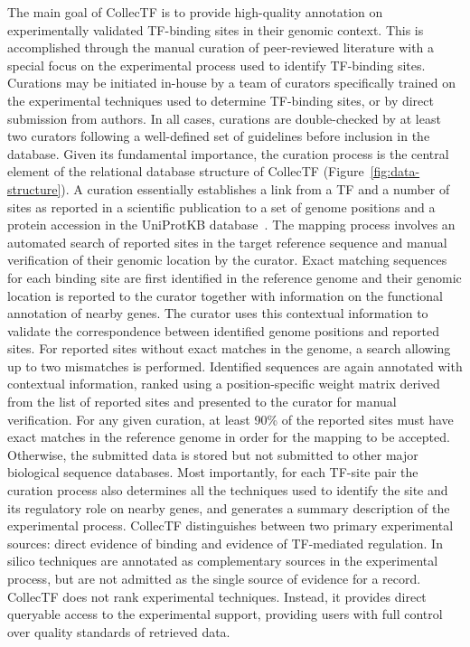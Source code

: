 
The main goal of CollecTF is to provide high-quality annotation on
experimentally validated TF-binding sites in their genomic context. This is
accomplished through the manual curation of peer-reviewed literature with a
special focus on the experimental process used to identify TF-binding
sites. Curations may be initiated in-house by a team of curators specifically
trained on the experimental techniques used to determine TF-binding sites, or
by direct submission from authors. In all cases, curations are double-checked
by at least two curators following a well-defined set of guidelines before
inclusion in the database. Given its fundamental importance, the curation
process is the central element of the relational database structure of CollecTF
(Figure~\ref{fig:data-structure}). A curation essentially establishes a link
from a TF and a number of sites as reported in a scientific publication to a
set of genome positions and a protein accession in the UniProtKB
database~\cite{uniprot2014uniprot}. The mapping process involves an automated
search of reported sites in the target reference sequence and manual
verification of their genomic location by the curator. Exact matching sequences
for each binding site are first identified in the reference genome and their
genomic location is reported to the curator together with information on the
functional annotation of nearby genes. The curator uses this contextual
information to validate the correspondence between identified genome positions
and reported sites. For reported sites without exact matches in the genome, a
search allowing up to two mismatches is performed. Identified sequences are
again annotated with contextual information, ranked using a position-specific
weight matrix derived from the list of reported sites and presented to the
curator for manual verification. For any given curation, at least 90\% of the
reported sites must have exact matches in the reference genome in order for the
mapping to be accepted. Otherwise, the submitted data is stored but not
submitted to other major biological sequence databases. Most importantly, for
each TF-site pair the curation process also determines all the techniques used
to identify the site and its regulatory role on nearby genes, and generates a
summary description of the experimental process. CollecTF distinguishes between
two primary experimental sources: direct evidence of binding and evidence of
TF-mediated regulation. In silico techniques are annotated as complementary
sources in the experimental process, but are not admitted as the single source
of evidence for a record. CollecTF does not rank experimental
techniques. Instead, it provides direct queryable access to the experimental
support, providing users with full control over quality standards of retrieved
data.

